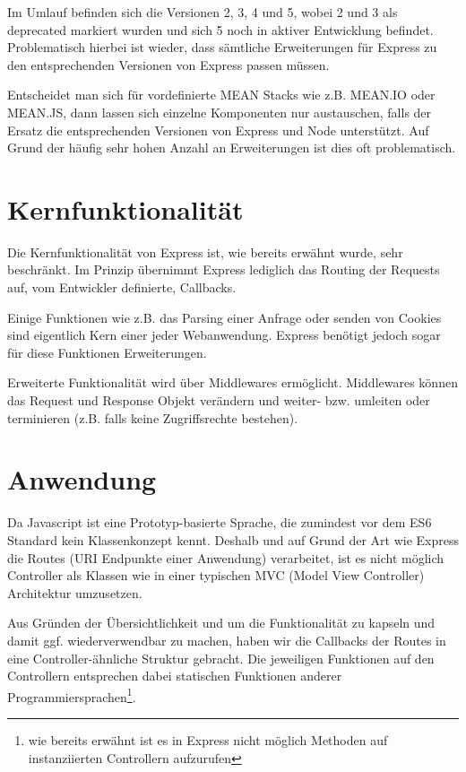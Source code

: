 Im Umlauf befinden sich die Versionen 2, 3, 4 und 5, wobei 2 und 3 als
deprecated markiert wurden und sich 5 noch in aktiver Entwicklung
befindet. Problematisch hierbei ist wieder, dass sämtliche Erweiterungen
für Express zu den entsprechenden Versionen von Express passen müssen.

Entscheidet man sich für vordefinierte MEAN Stacks wie z.B. MEAN.IO oder
MEAN.JS, dann lassen sich einzelne Komponenten nur austauschen, falls
der Ersatz die entsprechenden Versionen von Express und Node
unterstützt. Auf Grund der häufig sehr hohen Anzahl an Erweiterungen ist
dies oft problematisch.

\section{Kernfunktionalität}\label{kernfunktionalituxe4t}

Die Kernfunktionalität von Express ist, wie bereits erwähnt wurde, sehr
beschränkt. Im Prinzip übernimmt Express lediglich das Routing der
Requests auf, vom Entwickler definierte, Callbacks.

Einige Funktionen wie z.B. das Parsing einer Anfrage oder senden von Cookies
sind eigentlich Kern einer jeder Webanwendung. Express benötigt jedoch sogar für
diese Funktionen Erweiterungen.

Erweiterte Funktionalität wird über Middlewares ermöglicht. Middlewares
können das Request und Response Objekt verändern und weiter- bzw.
umleiten oder terminieren (z.B. falls keine Zugriffsrechte bestehen).

\section{Anwendung}\label{anwendung}

Da Javascript ist eine Prototyp-basierte Sprache, die zumindest vor dem
ES6 Standard kein Klassenkonzept kennt. Deshalb und auf Grund der Art wie Express
die Routes (URI Endpunkte einer Anwendung) verarbeitet, ist es nicht möglich Controller als Klassen wie
in einer typischen MVC (Model View Controller) Architektur umzusetzen.

Aus Gründen der Übersichtlichkeit und um die Funktionalität zu kapseln
und damit ggf. wiederverwendbar zu machen, haben wir die Callbacks der Routes in
eine Controller-ähnliche Struktur gebracht. Die jeweiligen Funktionen
auf den Controllern entsprechen dabei statischen Funktionen anderer
Programmiersprachen\footnote{wie bereits erwähnt ist es in Express nicht möglich
Methoden auf instanziierten Controllern aufzurufen}.

